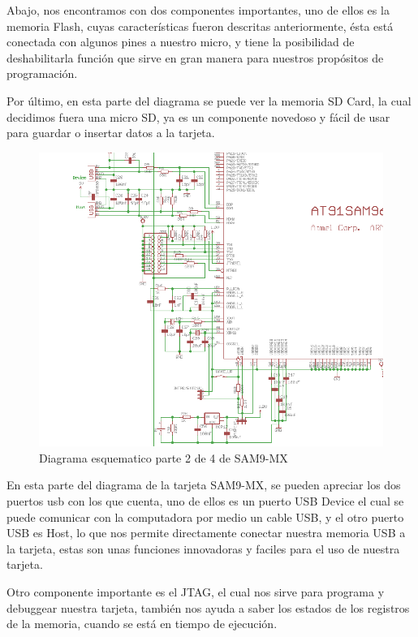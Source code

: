 Abajo, nos encontramos con dos componentes importantes, uno de ellos es la memoria Flash, cuyas caracter\'isticas fueron descritas anteriormente, \'esta est\'a conectada con algunos pines a nuestro micro, y tiene la posibilidad de deshabilitarla funci\'on que sirve en gran manera para nuestros prop\'ositos de programaci\'on.\medskip

Por \'ultimo, en esta parte del diagrama se puede ver la memoria SD Card, la cual decidimos fuera una micro SD, ya es un componente novedoso y f\'acil de usar para guardar o insertar datos a la tarjeta.\medskip

\begin{figure}[H]
\includegraphics[scale=0.55]{samEsq2}
\caption{Diagrama esquematico parte 2 de 4 de SAM9-MX}\label{fig:samEsq2}
\end{figure}

En esta parte del diagrama de la tarjeta SAM9-MX, se pueden apreciar los dos puertos usb con los que cuenta, uno de ellos es un puerto USB Device el cual se puede comunicar con la computadora por medio un cable USB, y el otro puerto USB es Host, lo que nos permite directamente conectar nuestra memoria USB a la tarjeta,
estas son unas funciones innovadoras y faciles para el uso de nuestra tarjeta.\medskip

Otro componente importante es el JTAG, el cual nos sirve para programa y debuggear nuestra tarjeta, tambi\'en nos ayuda a saber los estados de los registros de la memoria, cuando se est\'a en tiempo de ejecuci\'on.\medskip


